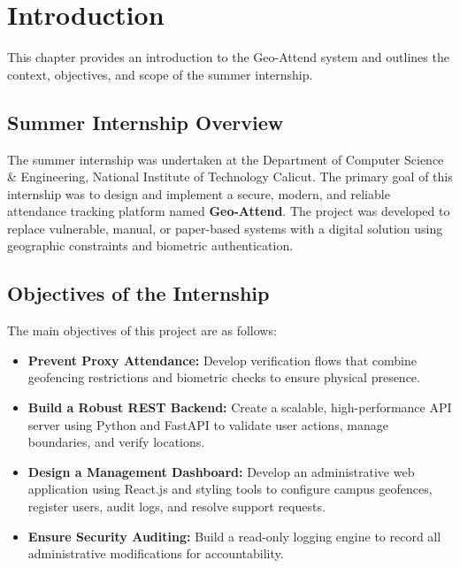 \documentclass[12pt]{report}
\begin{document}
{\tableofcontents
{}
\listoffigures
\listoftables
\vspace{-2 em}
\printglossary[nonumberlist]


\chapter{Introduction}
This chapter provides an introduction to the Geo-Attend system and outlines the context, objectives, and scope of the summer internship.

\section{Summer Internship Overview}
The summer internship was undertaken at the Department of Computer Science \& Engineering, National Institute of Technology Calicut. The primary goal of this internship was to design and implement a secure, modern, and reliable attendance tracking platform named \textbf{Geo-Attend}. The project was developed to replace vulnerable, manual, or paper-based systems with a digital solution using geographic constraints and biometric authentication.

\section{Objectives of the Internship}
The main objectives of this project are as follows:
\begin{itemize}
    \item \textbf{Prevent Proxy Attendance:} Develop verification flows that combine geofencing restrictions and biometric checks to ensure physical presence.
    \item \textbf{Build a Robust REST Backend:} Create a scalable, high-performance API server using Python and FastAPI to validate user actions, manage boundaries, and verify locations.
    \item \textbf{Design a Management Dashboard:} Develop an administrative web application using React.js and styling tools to configure campus geofences, register users, audit logs, and resolve support requests.
    \item \textbf{Ensure Security Auditing:} Build a read-only logging engine to record all administrative modifications for accountability.
\end{itemize}

}
\end{document}
